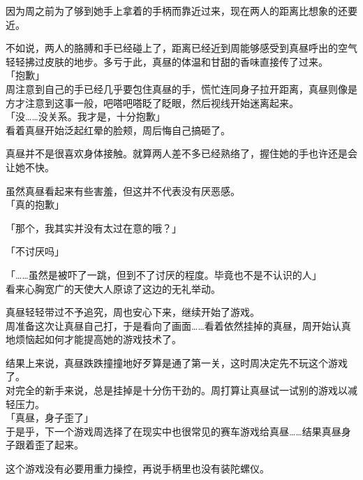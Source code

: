 因为周之前为了够到她手上拿着的手柄而靠近过来，现在两人的距离比想象的还要近。

不如说，两人的胳膊和手已经碰上了，距离已经近到周能够感受到真昼呼出的空气轻轻拂过皮肤的地步。多亏于此，真昼的体温和甘甜的香味直接传了过来。\\

「抱歉」\\

周注意到自己的手已经几乎要包住真昼的手，慌忙连同身子拉开距离，真昼则像是方才注意到这事一般，吧嗒吧嗒眨了眨眼，然后视线开始迷离起来。\\

「没……没关系。我才是，十分抱歉」\\

看着真昼开始泛起红晕的脸颊，周后悔自己搞砸了。

真昼并不是很喜欢身体接触。就算两人差不多已经熟络了，握住她的手也许还是会让她不快。

虽然真昼看起来有些害羞，但这并不代表没有厌恶感。\\

「真的抱歉」

「那个，我其实并没有太过在意的哦？」

「不讨厌吗」

「……虽然是被吓了一跳，但到不了讨厌的程度。毕竟也不是不认识的人」\\

看来心胸宽广的天使大人原谅了这边的无礼举动。

真昼轻轻带过不予追究，周也安心下来，继续开始了游戏。\\

周准备这次让真昼自己打，于是看向了画面……看着依然挂掉的真昼，周开始认真地烦恼起如何才能提高她的游戏技术了。\\

\vspace{2\baselineskip}

结果上来说，真昼跌跌撞撞地好歹算是通了第一关，这时周决定先不玩这个游戏了。\\

对完全的新手来说，总是挂掉是十分伤干劲的。周打算让真昼试一试别的游戏以减轻压力。\\

「真昼，身子歪了」\\

于是乎，下一个游戏周选择了在现实中也很常见的赛车游戏给真昼……结果真昼身子跟着歪了起来。

这个游戏没有必要用重力操控，再说手柄里也没有装陀螺仪。\\

